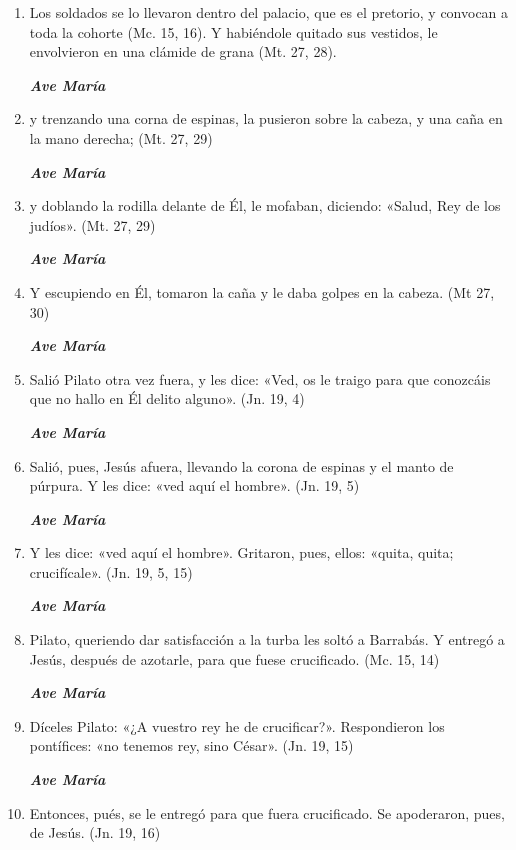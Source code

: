 \documentclass[a4paper,11pt, oneside]{report}
\begin{document}
      \begin{enumerate}

        \item Los soldados se lo llevaron dentro del palacio, que es el pretorio, y convocan a toda la cohorte (Mc. 15, 16).
        Y habiéndole quitado sus vestidos, le envolvieron en una clámide de grana (Mt. 27, 28).

        \textbf{\textit{Ave María}}

        \item y trenzando una corna de espinas, la pusieron sobre la cabeza, y una caña en la mano derecha; (Mt. 27, 29)

        \textbf{\textit{Ave María}}

        \item y doblando la rodilla delante de Él, le mofaban, diciendo: «Salud, Rey de los judíos». (Mt. 27, 29)

        \textbf{\textit{Ave María}}

        \item Y escupiendo en Él, tomaron la caña y le daba golpes en la cabeza. (Mt 27, 30)

        \textbf{\textit{Ave María}}

        \item Salió Pilato otra vez fuera, y les dice: «Ved, os le traigo para que conozcáis que no hallo en Él delito alguno». (Jn. 19, 4)

        \textbf{\textit{Ave María}}

        \item Salió, pues, Jesús afuera, llevando la corona de espinas y el manto de púrpura. Y les dice: «ved aquí el hombre». (Jn. 19, 5)

        \textbf{\textit{Ave María}}

        \item Y les dice: «ved aquí el hombre». Gritaron, pues, ellos: «quita, quita; crucifícale». (Jn. 19, 5, 15)

        \textbf{\textit{Ave María}}

        \item Pilato, queriendo dar satisfacción a la turba les soltó a Barrabás. Y entregó a Jesús, después de azotarle, para que fuese crucificado. (Mc. 15, 14)

        \textbf{\textit{Ave María}}

        \item Díceles Pilato: «¿A vuestro rey he de crucificar?». Respondieron los pontífices: «no tenemos rey, sino César». (Jn. 19, 15)

        \textbf{\textit{Ave María}}

        \item Entonces, pués, se le entregó para que fuera crucificado. Se apoderaron, pues, de Jesús. (Jn. 19, 16)

      \end{enumerate}
\end{document}
